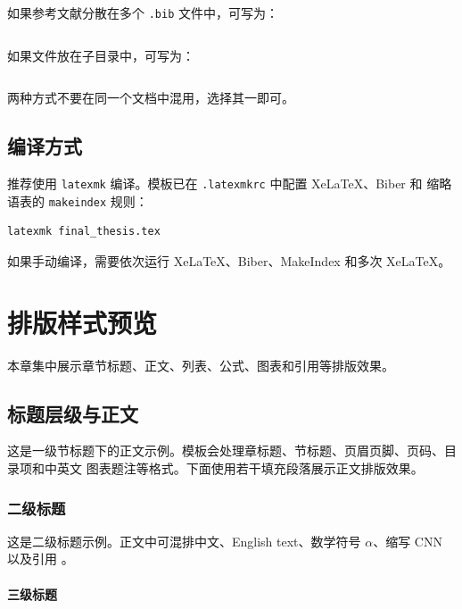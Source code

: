 如果参考文献分散在多个 \texttt{.bib} 文件中，可写为：

\begin{verbatim}

\end{verbatim}

如果文件放在子目录中，可写为：

\begin{verbatim}

\end{verbatim}

两种方式不要在同一个文档中混用，选择其一即可。

\section{编译方式}

推荐使用 \texttt{latexmk} 编译。模板已在 \texttt{.latexmkrc} 中配置 XeLaTeX、Biber 和
缩略语表的 \texttt{makeindex} 规则：

\begin{verbatim}
latexmk final_thesis.tex
\end{verbatim}

如果手动编译，需要依次运行 XeLaTeX、Biber、MakeIndex 和多次 XeLaTeX。

\chapter{排版样式预览}

本章集中展示章节标题、正文、列表、公式、图表和引用等排版效果。

\section{标题层级与正文}

这是一级节标题下的正文示例。模板会处理章标题、节标题、页眉页脚、页码、目录项和中英文
图表题注等格式。下面使用若干填充段落展示正文排版效果。

\zhlipsum*[1]

\subsection{二级标题}

这是二级标题示例。正文中可混排中文、English text、数学符号 $\alpha$、缩写 CNN 以及引用
\cite{krizhevsky2012imagenet}。

\subsubsection{三级标题}

